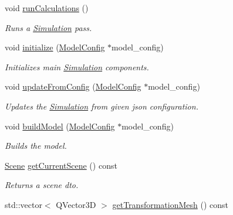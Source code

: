 \begin{DoxyCompactItemize}
\item 
\mbox{\label{class_simulation_afd97d61478060a4cc1bd7470f6c865aa}} 
void \mbox{\hyperlink{class_simulation_afd97d61478060a4cc1bd7470f6c865aa}{run\+Calculations}} ()
\begin{DoxyCompactList}\small\item\em Runs a \mbox{\hyperlink{class_simulation}{Simulation}} pass. \end{DoxyCompactList}\item 
void \mbox{\hyperlink{class_simulation_a9cb0aae7c447fd77c0dd7900e925e03e}{initialize}} (\mbox{\hyperlink{struct_model_config}{Model\+Config}} $\ast$model\+\_\+config)
\begin{DoxyCompactList}\small\item\em Initializes main \mbox{\hyperlink{class_simulation}{Simulation}} components. \end{DoxyCompactList}\item 
void \mbox{\hyperlink{class_simulation_a0a19a19f99d3e88f020c8e1a4b7d8440}{update\+From\+Config}} (\mbox{\hyperlink{struct_model_config}{Model\+Config}} $\ast$model\+\_\+config)
\begin{DoxyCompactList}\small\item\em Updates the \mbox{\hyperlink{class_simulation}{Simulation}} from given json configuration. \end{DoxyCompactList}\item 
void \mbox{\hyperlink{class_simulation_a6b801c919ee95c0d967a8037cd73afe5}{build\+Model}} (\mbox{\hyperlink{struct_model_config}{Model\+Config}} $\ast$model\+\_\+config)
\begin{DoxyCompactList}\small\item\em Builds the model. \end{DoxyCompactList}\item 
\mbox{\label{class_simulation_ad9bd99eb4bc5bb719f7a9a7abe377b49}} 
\mbox{\hyperlink{class_scene}{Scene}} \mbox{\hyperlink{class_simulation_ad9bd99eb4bc5bb719f7a9a7abe377b49}{get\+Current\+Scene}} () const
\begin{DoxyCompactList}\small\item\em Returns a scene dto. \end{DoxyCompactList}\item 
std\+::vector$<$ Q\+Vector3D $>$ \mbox{\hyperlink{class_simulation_a51325a28f5c8d5e37cb8d90fb6f79634}{get\+Transformation\+Mesh}} () const

\end{DoxyCompactItemize}
